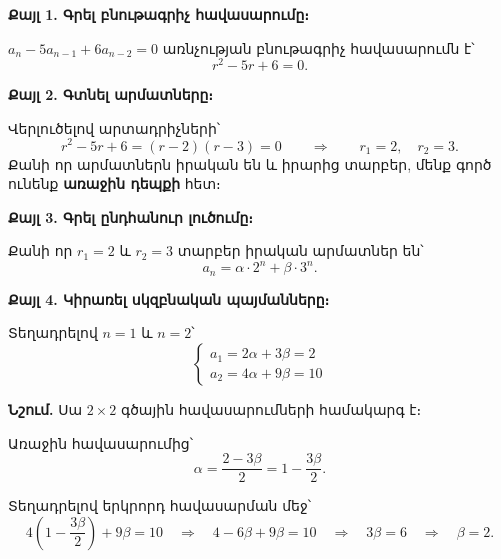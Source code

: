 \documentclass[12pt, a4paper]{article}
\begin{document}
\medskip
\textbf{Քայլ 1. Գրել բնութագրիչ հավասարումը։}

$a_n - 5a_{n-1} + 6a_{n-2} = 0$ առնչության բնութագրիչ հավասարումն է՝
\[
  r^2 - 5r + 6 = 0.
\]

\textbf{Քայլ 2. Գտնել արմատները։}

Վերլուծելով արտադրիչների՝
\[
  r^2 - 5r + 6 = (r - 2)(r - 3) = 0
  \qquad\Longrightarrow\qquad r_1 = 2, \quad r_2 = 3.
\]
Քանի որ արմատներն իրական են և իրարից տարբեր, մենք գործ ունենք \textbf{առաջին դեպքի} հետ։

\begin{center}
\end{center}

\textbf{Քայլ 3. Գրել ընդհանուր լուծումը։}

Քանի որ $r_1 = 2$ և $r_2 = 3$ տարբեր իրական արմատներ են՝
\[
  a_n = \alpha \cdot 2^n + \beta \cdot 3^n.
\]

\textbf{Քայլ 4. Կիրառել սկզբնական պայմանները։}

Տեղադրելով $n = 1$ և $n = 2$՝
\[
  \begin{cases}
    a_1 = 2\alpha + 3\beta = 2 \\[3pt]
    a_2 = 4\alpha + 9\beta = 10
  \end{cases}
\]

\textbf{Նշում.}\; Սա $2 \times 2$ գծային հավասարումների համակարգ է։

Առաջին հավասարումից՝
\[
  \alpha = \frac{2 - 3\beta}{2} = 1 - \frac{3\beta}{2}.
\]

Տեղադրելով երկրորդ հավասարման մեջ՝
\[
  4\!\left(1 - \frac{3\beta}{2}\right) + 9\beta = 10
  \quad\Longrightarrow\quad
  4 - 6\beta + 9\beta = 10
  \quad\Longrightarrow\quad
  3\beta = 6
  \quad\Longrightarrow\quad
  \beta = 2.
\]
\end{document}
